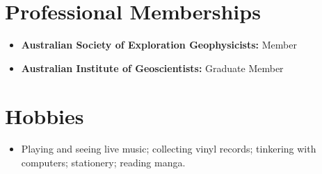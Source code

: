 \documentclass[letterpaper,11pt]{article}
\newcommand{\resumeItem}[2]{
  \item\small{
    \textbf{#1}{#2 \vspace{-2pt}}
  }
}
\newcommand{\resumeSubItem}[2]{\resumeItem{#1}{#2}\vspace{-4pt}}
\newcommand{\resumeSubHeadingListStart}{\begin{itemize}[leftmargin=*]}
\newcommand{\resumeSubHeadingListEnd}{\end{itemize}}
\begin{document}
\section{Professional Memberships}
  \resumeSubHeadingListStart
    \resumeSubItem{Australian Society of Exploration Geophysicists: }
      {Member}
    \resumeSubItem{Australian Institute of Geoscientists: }
      {Graduate Member}
  \resumeSubHeadingListEnd


\section{Hobbies}
  \resumeSubHeadingListStart
    \resumeSubItem{}
      {Playing and seeing live music; collecting vinyl records; tinkering with computers; stationery; reading manga.}
  \resumeSubHeadingListEnd




\end{document}
